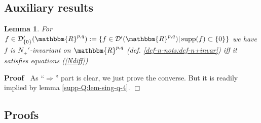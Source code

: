 \documentclass{article}
\newcommand{\assign}{:=}
\newcommand{\tmop}[1]{\ensuremath{\operatorname{#1}}}
\renewenvironment{proof}{\noindent\textbf{Proof\ }}{\hspace*{\fill}$\Box$\medskip}
\newtheorem{lemma}[proposition]{Lemma}
\theoremstyle{remark}
\begin{document}
\subsection{Auxiliary results}

\begin{lemma}
  \label{diffSBO:lem-aux}For $f \in \mathcal{D}'_{\{ 0 \}} (\mathbbm{R}^{p,
  q}) \assign \{ f \in \mathcal{D}' (\mathbbm{R}^{p, q}) | \tmop{supp} (f)
  \subset \{ 0 \} \}$ we have $f$ is $N_+'$-invariant on $\mathbbm{R}^{p, q}$
  (def. \ref{def-n-nots:def-n+invar}) iff it satisfies equations (\ref{Ndiff})
\end{lemma}

\begin{proof}
  As ``$\Rightarrow$'' part is clear, we just prove the converse. But it is
  readily implied by lemma \ref{supp-Q:lem-sing-q-4}.
\end{proof}

\subsection{Proofs}
\end{document}
